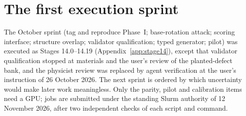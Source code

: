 \documentclass[10pt,a4paper]{article}
\begin{document}
\section{The first execution sprint}
\label{sec:sprint}

The October sprint (tag and reproduce Phase~I; base-rotation attack; scoring interface; structure overlap;
validator qualification; typed generator; pilot) was executed as Stages 14.0--14.19 (Appendix~\ref{app:stage14}),
except that validator qualification stopped at materials and the user's review of the planted-defect bank, and the
physicist review was replaced by agent verification at the user's instruction of 26 October 2026. The next sprint
is ordered by which uncertainty would make later work meaningless. Only the parity, pilot and calibration items
need a GPU; jobs are submitted under the
standing Slurm authority of 12 November 2026, after two independent checks of each script and command.
\end{document}
